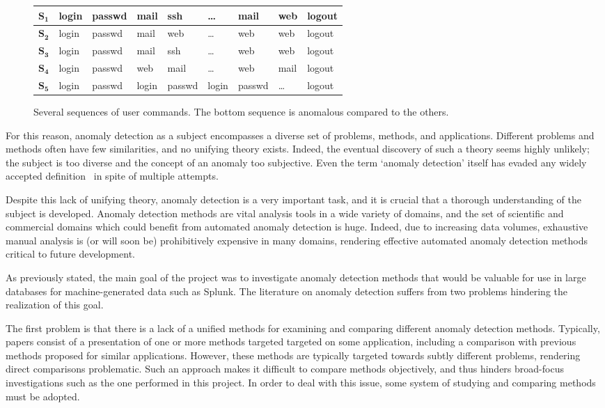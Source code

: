 \begin{figure}[htb]
    \centering
    \begin{tabular}{| l | l l l l l l l l |}
        \hline
        $\mathbf{S_1}$ & login & passwd & mail & ssh & \dots & mail & web & logout \\ \hline
        $\mathbf{S_2}$ & login & passwd & mail & web & \dots & web & web & logout \\ \hline
        $\mathbf{S_3}$ & login & passwd & mail & ssh & \dots & web & web & logout \\ \hline
        $\mathbf{S_4}$ & login & passwd & web & mail & \dots & web & mail & logout \\ \hline
        $\mathbf{S_5}$ & login & passwd & login & passwd & login & passwd & \dots & logout \\\hline
    \end{tabular}
    \caption{Several sequences of user commands. The bottom sequence is anomalous compared to the others.}
\label{fig:example1}
\end{figure}

For this reason, anomaly detection as a subject encompasses a diverse set of problems, methods, and applications. Different problems and methods often have few similarities, and no unifying theory exists. Indeed, the eventual discovery of such a theory seems highly unlikely; the subject is too diverse and the concept of an anomaly too subjective. Even the term `anomaly detection' itself has evaded any widely accepted definition~\cite{hodge} in spite of multiple attempts.

Despite this lack of unifying theory, anomaly detection is a very important task, and it is crucial that a thorough understanding of the subject is developed. Anomaly detection methods are vital analysis tools in a wide variety of domains, and the set of scientific and commercial domains which could benefit from automated anomaly detection is huge. Indeed, due to increasing data volumes, exhaustive manual analysis is (or will soon be) prohibitively expensive in many domains, rendering effective automated anomaly detection methods critical to future development.

As previously stated, the main goal of the project was to investigate anomaly detection methods that would be valuable for use in large databases for machine-generated data such as Splunk. The literature on anomaly detection suffers from two problems hindering the realization of this goal.

The first problem is that there is a lack of a unified methods for examining and comparing different anomaly detection methods. Typically, papers consist of a presentation of one or more methods targeted targeted on some application, including a comparison  with previous methods proposed for similar applications. However, these methods are typically targeted towards subtly different problems, rendering direct comparisons problematic. Such an approach makes it difficult to compare methods objectively, and thus hinders broad-focus investigations such as the one performed in this project. In order to deal with this issue, some system of studying and comparing methods must be adopted.


